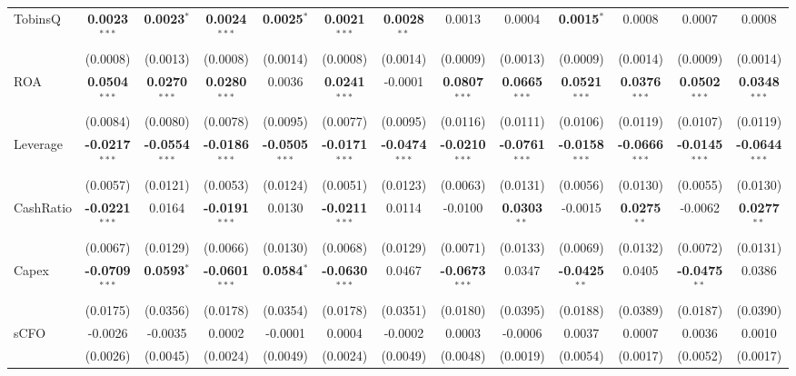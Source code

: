 \begin{landscape}
\begin{table}[H]
\begin{tabular}{lcccccccccccc}
TobinsQ & \textbf{0.0023}$^{***}$ & \textbf{0.0023}$^{*}$ & \textbf{0.0024}$^{***}$ & \textbf{0.0025}$^{*}$ & \textbf{0.0021}$^{***}$ & \textbf{0.0028}$^{**}$ & 0.0013 & 0.0004 & \textbf{0.0015}$^{*}$ & 0.0008 & 0.0007 & 0.0008 \\
 & (0.0008) & (0.0013) & (0.0008) & (0.0014) & (0.0008) & (0.0014) & (0.0009) & (0.0013) & (0.0009) & (0.0014) & (0.0009) & (0.0014) \\
ROA & \textbf{0.0504}$^{***}$ & \textbf{0.0270}$^{***}$ & \textbf{0.0280}$^{***}$ & 0.0036 & \textbf{0.0241}$^{***}$ & -0.0001 & \textbf{0.0807}$^{***}$ & \textbf{0.0665}$^{***}$ & \textbf{0.0521}$^{***}$ & \textbf{0.0376}$^{***}$ & \textbf{0.0502}$^{***}$ & \textbf{0.0348}$^{***}$ \\
 & (0.0084) & (0.0080) & (0.0078) & (0.0095) & (0.0077) & (0.0095) & (0.0116) & (0.0111) & (0.0106) & (0.0119) & (0.0107) & (0.0119) \\
Leverage & \textbf{-0.0217}$^{***}$ & \textbf{-0.0554}$^{***}$ & \textbf{-0.0186}$^{***}$ & \textbf{-0.0505}$^{***}$ & \textbf{-0.0171}$^{***}$ & \textbf{-0.0474}$^{***}$ & \textbf{-0.0210}$^{***}$ & \textbf{-0.0761}$^{***}$ & \textbf{-0.0158}$^{***}$ & \textbf{-0.0666}$^{***}$ & \textbf{-0.0145}$^{***}$ & \textbf{-0.0644}$^{***}$ \\
 & (0.0057) & (0.0121) & (0.0053) & (0.0124) & (0.0051) & (0.0123) & (0.0063) & (0.0131) & (0.0056) & (0.0130) & (0.0055) & (0.0130) \\
CashRatio & \textbf{-0.0221}$^{***}$ & 0.0164 & \textbf{-0.0191}$^{***}$ & 0.0130 & \textbf{-0.0211}$^{***}$ & 0.0114 & -0.0100 & \textbf{0.0303}$^{**}$ & -0.0015 & \textbf{0.0275}$^{**}$ & -0.0062 & \textbf{0.0277}$^{**}$ \\
 & (0.0067) & (0.0129) & (0.0066) & (0.0130) & (0.0068) & (0.0129) & (0.0071) & (0.0133) & (0.0069) & (0.0132) & (0.0072) & (0.0131) \\
Capex & \textbf{-0.0709}$^{***}$ & \textbf{0.0593}$^{*}$ & \textbf{-0.0601}$^{***}$ & \textbf{0.0584}$^{*}$ & \textbf{-0.0630}$^{***}$ & 0.0467 & \textbf{-0.0673}$^{***}$ & 0.0347 & \textbf{-0.0425}$^{**}$ & 0.0405 & \textbf{-0.0475}$^{**}$ & 0.0386 \\
 & (0.0175) & (0.0356) & (0.0178) & (0.0354) & (0.0178) & (0.0351) & (0.0180) & (0.0395) & (0.0188) & (0.0389) & (0.0187) & (0.0390) \\
sCFO & -0.0026 & -0.0035 & 0.0002 & -0.0001 & 0.0004 & -0.0002 & 0.0003 & -0.0006 & 0.0037 & 0.0007 & 0.0036 & 0.0010 \\
 & (0.0026) & (0.0045) & (0.0024) & (0.0049) & (0.0024) & (0.0049) & (0.0048) & (0.0019) & (0.0054) & (0.0017) & (0.0052) & (0.0017) \\

\end{tabular}
\end{table}
\end{landscape}

